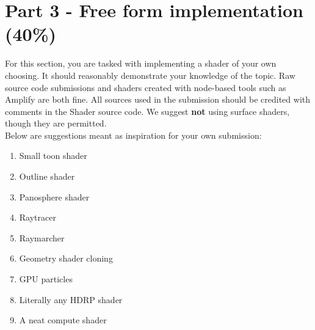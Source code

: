\documentclass{exam}
\begin{document}
\newpage\section*{Part 3 - Free form implementation (40\%)}
For this section, you are tasked with implementing a shader of your own choosing. It should reasonably demonstrate your knowledge of the topic. Raw source code submissions and shaders created with node-based tools such as Amplify are both fine. All sources used in the submission should be credited with comments in the Shader source code. We suggest \textbf{not} using surface shaders, though they are permitted.\\

Below are suggestions meant as inspiration for your own submission:
\begin{enumerate}
    \item Small toon shader
    \item Outline shader
    \item Panosphere shader
    \item Raytracer
    \item Raymarcher
    \item Geometry shader cloning
    \item GPU particles
    \item Literally any HDRP shader
    \item A neat compute shader
\end{enumerate}
\end{document}
